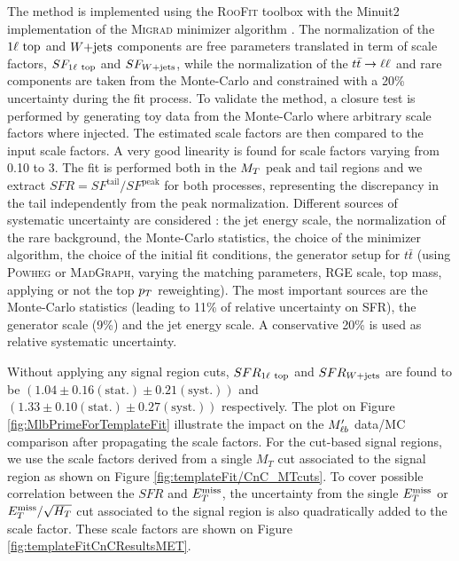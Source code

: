     The method is implemented using the \textsc{RooFit} toolbox  with the Minuit2 
    implementation of the \textsc{Migrad} minimizer algorithm . The normalization 
    of the $1\ell~\text{top}$ and $\text{$W$+jets}$ components are free parameters translated in term 
    of scale factors, $SF_{1\ell~\text{top}}$ and $SF_{\text{$W$+jets}}$, while the normalization of 
    the $t\bar{t} \rightarrow \ell \ell$ and rare components are taken from the Monte-Carlo and constrained 
    with a 20\% uncertainty during the fit process. To validate the method, a closure test 
    is performed by generating toy data from the Monte-Carlo where arbitrary scale factors 
    where injected. The estimated scale factors are then compared to the input scale factors. 
    A very good linearity is found for scale factors varying from 0.10 to 3. The fit is 
    performed both in the $M_T$ peak and tail regions and we extract $SFR = SF^{\text{tail}} 
    / SF^{\text{peak}}$ for both processes, representing the discrepancy in the tail 
    independently from the peak normalization. Different sources of systematic uncertainty 
    are considered : the jet energy scale, the normalization of the rare background, the 
    Monte-Carlo statistics, the choice of the minimizer algorithm, the choice of the 
    initial fit conditions, the generator setup for $t\bar{t}$ (using \textsc{Powheg} or 
    \textsc{MadGraph}, varying the matching parameters, RGE scale, top mass, applying or 
    not the top $p_T$ reweighting). The most important sources are the Monte-Carlo statistics 
    (leading to 11\% of relative uncertainty on SFR), the generator scale (9\%) and the jet 
    energy scale. A conservative 20\% is used as relative systematic uncertainty.

    Without applying any signal region cuts, $SFR_{1\ell~\text{top}}$ and $SFR_{\text{$W$+jets}}$ are found 
    to be $(1.04 \pm 0.16 (\text{stat.}) \pm 0.21 (\text{syst.}))$ and $(1.33 \pm 0.10 
    (\text{stat.}) \pm 0.27 (\text{syst.}) )$ respectively. The plot on Figure \ref{fig:MlbPrimeForTemplateFit} 
    illustrate the impact on the $M'_{\ell b}$ data/MC comparison after propagating the scale 
    factors. For the cut-based signal regions, we use the scale factors derived from a 
    single $M_T$ cut associated to the signal region as shown on Figure \ref{fig:templateFit/CnC_MTcuts}.
    To cover possible correlation between the $SFR$ and $E_T^\text{miss}$, the uncertainty from the 
    single $E_T^\text{miss}$ or $E_T^\text{miss}/\sqrt{H_T}$ cut associated to the signal region is also 
    quadratically added to the scale factor. These scale factors are shown on Figure \ref{fig:templateFitCnCResultsMET}.

